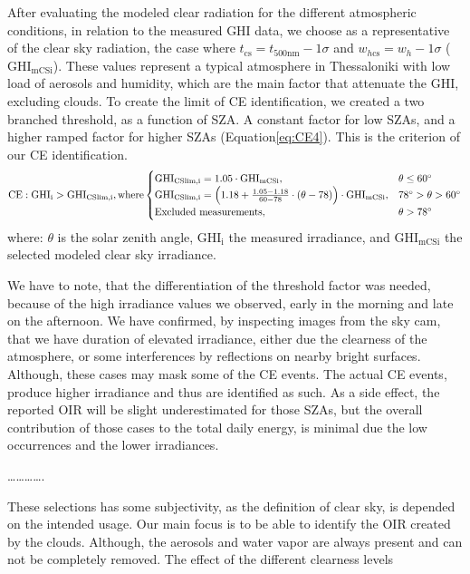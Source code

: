 \documentclass[
]{article}
\begin{document}
After evaluating the modeled clear radiation for the different atmospheric
conditions, in relation to the measured GHI data, we choose as a representative of
the clear sky radiation, the case where
\(t_{\text{cs}} = t_{500\text{nm}} - 1\sigma\) and \(w_{h\text{cs}} = w_h - 1\sigma\)
(\(\text{GHI}_\text{mCSi}\)).
These values represent a typical atmosphere in Thessaloniki with low load of aerosols
and humidity, which are the main factor that attenuate the GHI, excluding clouds. To
create the limit of CE identification, we created a two branched threshold, as a
function of SZA. A constant factor for low SZAs, and a higher ramped factor for
higher SZAs (Equation\nobreakspace\ref{eq:CE4}).
This is the criterion of our CE identification.
\begin{equation}
\text{CE} : \text{GHI}_\text{i} > \text{GHI}_\text{CSlim,i}, \text{where} \begin{cases}
 \text{GHI}_\text{CSlim,i} = 1.05 \cdot \text{GHI}_\text{mCSi}, & \text{$\theta \leq 60^\circ$}\\
\text{GHI}_\text{CSlim,i} = \left ({ 1.18 + \frac{1.05 - 1.18}{60 - 78} \cdot (\theta- 78) } \right ) \cdot \text{GHI}_\text{mCSi}, & \text{$ 78^\circ > \theta > 60^\circ$}\\
\text{Excluded measurements}, & \theta > 78^\circ
\end{cases}\label{eq:CE4}
\end{equation}
where: \(\theta\) is the solar zenith angle, \(\text{GHI}_\text{i}\) the measured
irradiance, and \(\text{GHI}_\text{mCSi}\) the selected modeled clear sky irradiance.

We have to note, that the differentiation of the threshold factor was needed, because
of the high irradiance values we observed, early in the morning and late on the
afternoon. We have confirmed, by inspecting images from the sky cam, that we have
duration of elevated irradiance, either due the clearness of the atmosphere, or some
interferences by reflections on nearby bright surfaces. Although, these cases may
mask some of the CE events. The actual CE events, produce higher irradiance and thus
are identified as such. As a side effect, the reported OIR will be slight
underestimated for those SZAs, but the overall contribution of those cases to the
total daily energy, is minimal due the low occurrences and the lower irradiances.

\ldots\ldots\ldots\ldots.

These selections has some subjectivity, as the definition of clear sky, is depended
on the intended usage. Our main focus is to be able to identify the OIR created by the
clouds. Although, the aerosols and water vapor are always present and can not be
completely removed.
The effect of the different clearness levels
\end{document}
